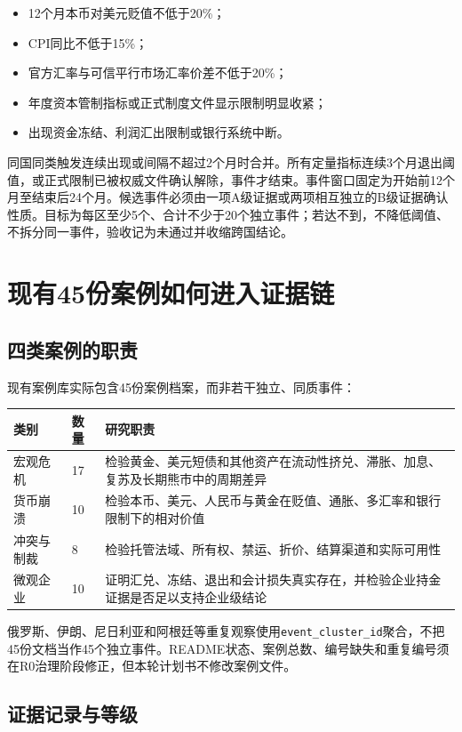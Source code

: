 \documentclass[UTF8,fontset=windows,12pt,openany]{ctexbook}
\newcommand{\Field}[1]{{\small\nolinkurl{#1}}}
\begin{document}
\begin{itemize}
  \item 12个月本币对美元贬值不低于20\%；
  \item CPI同比不低于15\%；
  \item 官方汇率与可信平行市场汇率价差不低于20\%；
  \item 年度资本管制指标或正式制度文件显示限制明显收紧；
  \item 出现资金冻结、利润汇出限制或银行系统中断。
\end{itemize}

同国同类触发连续出现或间隔不超过2个月时合并。所有定量指标连续3个月退出阈值，或正式限制已被权威文件确认解除，事件才结束。事件窗口固定为开始前12个月至结束后24个月。候选事件必须由一项A级证据或两项相互独立的B级证据确认性质。目标为每区至少5个、合计不少于20个独立事件；若达不到，不降低阈值、不拆分同一事件，验收记为未通过并收缩跨国结论。

\chapter{现有45份案例如何进入证据链}

\section{四类案例的职责}

现有案例库实际包含45份案例档案，而非若干独立、同质事件：

\begin{longtable}{p{2.5cm}p{2.0cm}p{8.7cm}}
\toprule
\textbf{类别} & \textbf{数量} & \textbf{研究职责}\\
\midrule
宏观危机 & 17 & 检验黄金、美元短债和其他资产在流动性挤兑、滞胀、加息、复苏及长期熊市中的周期差异\\
货币崩溃 & 10 & 检验本币、美元、人民币与黄金在贬值、通胀、多汇率和银行限制下的相对价值\\
冲突与制裁 & 8 & 检验托管法域、所有权、禁运、折价、结算渠道和实际可用性\\
微观企业 & 10 & 证明汇兑、冻结、退出和会计损失真实存在，并检验企业持金证据是否足以支持企业级结论\\
\bottomrule
\end{longtable}

俄罗斯、伊朗、尼日利亚和阿根廷等重复观察使用\Field{event_cluster_id}聚合，不把45份文档当作45个独立事件。README状态、案例总数、编号缺失和重复编号须在R0治理阶段修正，但本轮计划书不修改案例文件。

\section{证据记录与等级}
\end{document}
